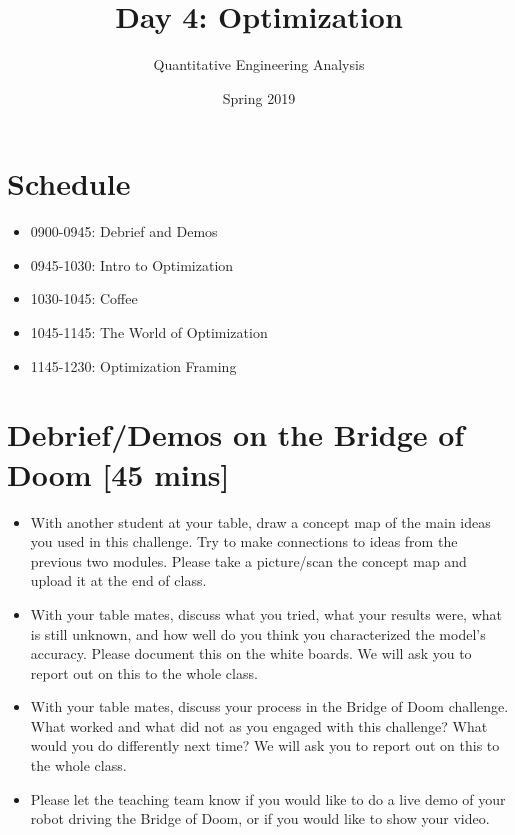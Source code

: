 \documentclass{tufte-handout}
\title{Day 4: Optimization}
\author{Quantitative Engineering Analysis}
\date{Spring 2019}
\def \BoD {Bridge of Doom\texttrademark}
\begin{document}
\maketitle
\thispagestyle{firstpage}

\section{Schedule}
\begin{itemize}
\item 0900-0945: Debrief and Demos
\item 0945-1030: Intro to Optimization
\item 1030-1045: Coffee
\item 1045-1145: The World of Optimization
\item 1145-1230: Optimization Framing
\end{itemize}

\section{Debrief/Demos on the Bridge of Doom [45 mins]}

\begin{itemize}
\item With another student at your table, draw a concept map of the main ideas you used in this challenge. Try to make connections to ideas from the previous two modules. Please take a picture/scan the concept map and upload it at the end of class.
\item With your table mates, discuss  what you tried, what your results were, what is still unknown, and how well do you think you characterized the model's accuracy. Please document this on the white boards. We will ask you to report out on this to the whole class.
\item With your table mates, discuss your process in the Bridge of Doom challenge. What worked and what did not as you engaged with this challenge?  What would you do differently next time? We will ask you to report out on this to the whole class.
\item  Please let the teaching team know if you would like to do a live demo of your robot driving the \BoD, or if you would like to show your video.
\end{itemize}



\end{document}
